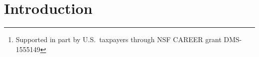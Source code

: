 \documentclass{daj}
\theoremstyle{definition}
\newcommand*{\Fq}{\mathbb{F}_q}                                  %
\begin{document}
\begin{frontmatter}[classification=text]


\newcommand*\samethanks[1][\value{footnote}]{\footnotemark[#1]}
\author[pgom]{Boris Bukh\thanks{Supported in part by U.S.\ taxpayers through NSF CAREER grant DMS-1555149}}
\author[joha]{Ting-Wei Chao\samethanks}

  
\begin{abstract}
A \emph{Kakeya} set in $\Fq^n$ is a set containing a line in every direction. We
show that every Kakeya set in $\Fq^n$ has density at least $1/2^{n-1}$, matching
the construction by Dvir, Kopparty, Saraf and Sudan.
\end{abstract}
\end{frontmatter}

\section{Introduction}
\end{document}
